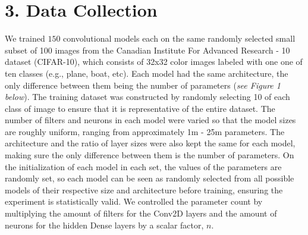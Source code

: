 \documentclass[12pt]{article}
\begin{document}
    \section*{3. Data Collection}

    We trained $150$ convolutional models each on the same randomly selected small subset of 100 images
    from the Canadian Institute For Advanced Research - 10 dataset (CIFAR-10), which consists of 32x32 color images labeled with one one of ten classes (e.g., plane, boat, etc).
    Each model had the same architecture, the only difference between them being the number of parameters (\textit{see Figure 1 below}).
    The training dataset was constructed by randomly selecting 10 of each class of image to ensure that it is representative of the entire dataset.
    The number of filters and neurons in each model were varied so that the model sizes are roughly uniform, ranging from approximately 1m - 25m parameters.
    The architecture and the ratio of layer sizes were also kept the same for each model, making sure the only difference between them is the number of parameters.
    On the initialization of each model in each set, the values of the parameters are randomly set, so each model can be seen as randomly
    selected from all possible models of their respective size and architecture before training, ensuring the experiment is statistically valid.
    We controlled the parameter count by multiplying the amount of filters for the Conv2D layers and the amount of neurons
    for the hidden Dense layers by a scalar factor, $n$.
\end{document}

